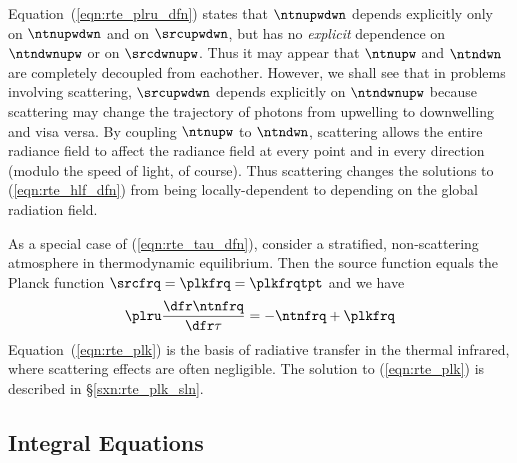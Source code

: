 \documentclass[12pt]{article}
\begin{document}
Equation~(\ref{eqn:rte_plru_dfn}) states that $\ntnupwdwn$ depends
explicitly only on $\ntnupwdwn$ and on $\srcupwdwn$, but has no
\textit{explicit} dependence on $\ntndwnupw$ or on $\srcdwnupw$.
Thus it may appear that $\ntnupw$ and $\ntndwn$ are completely
decoupled from eachother.
However, we shall see that in problems involving scattering, 
$\srcupwdwn$ depends explicitly on $\ntndwnupw$ because scattering
may change the trajectory of photons from upwelling to downwelling and
visa versa.
By coupling $\ntnupw$ to $\ntndwn$, scattering allows the 
entire radiance field to affect the radiance field at every point
and in every direction (modulo the speed of light, of course).
Thus scattering changes the solutions to (\ref{eqn:rte_hlf_dfn}) from 
being locally-dependent to depending on the global radiation field.

As a special case of (\ref{eqn:rte_tau_dfn}), consider a stratified,
non-scattering atmosphere in thermodynamic equilibrium.
Then the source function equals the Planck function $\srcfrq =
\plkfrq = \plkfrqtpt$ and we have
\begin{equation}
\plru \frac{\dfr\ntnfrq}{\dfr\tau} = -\ntnfrq + \plkfrq
\label{eqn:rte_plk}
\end{equation}
Equation~(\ref{eqn:rte_plk}) is the basis of radiative transfer in the
thermal infrared, where scattering effects are often negligible.
The solution to (\ref{eqn:rte_plk}) is described in
\S\ref{sxn:rte_plk_sln}. 

\subsection{Integral Equations}\label{sxn:rte_ntg}
\end{document}

